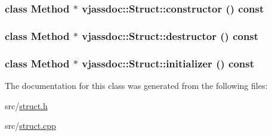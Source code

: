 \hypertarget{classvjassdoc_1_1Struct_41a8c77e86a5a04ee3e594c58e0f4ceb}{
\subsubsection{\setlength{\rightskip}{0pt plus 5cm}class {\bf Method} $\ast$ vjassdoc::Struct::constructor () const}}
\label{classvjassdoc_1_1Struct_41a8c77e86a5a04ee3e594c58e0f4ceb}


\hypertarget{classvjassdoc_1_1Struct_f4c2781402019fade0e674abbd5f161b}{
\subsubsection{\setlength{\rightskip}{0pt plus 5cm}class {\bf Method} $\ast$ vjassdoc::Struct::destructor () const}}
\label{classvjassdoc_1_1Struct_f4c2781402019fade0e674abbd5f161b}


\hypertarget{classvjassdoc_1_1Struct_234bd98d0902f34047f17f005a5f1dbe}{
\subsubsection{\setlength{\rightskip}{0pt plus 5cm}class {\bf Method} $\ast$ vjassdoc::Struct::initializer () const}}
\label{classvjassdoc_1_1Struct_234bd98d0902f34047f17f005a5f1dbe}




The documentation for this class was generated from the following files:\begin{CompactItemize}
\item 
src/\hyperlink{struct_8h}{struct.h}\item 
src/\hyperlink{struct_8cpp}{struct.cpp}\end{CompactItemize}
